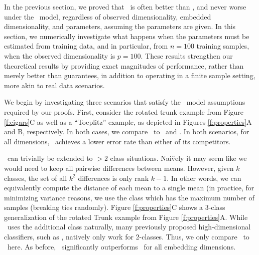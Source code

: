 \documentclass[10pt]{article}
\begin{document}


In the previous section, we proved that \Lol~is often better than \Pca, and never worse under the \Lda~model, regardless of observed dimensionality, embedded dimensionality, and parameters, assuming the parameters are given.  In this section, we numerically investigate what happens when the parameters must be estimated from training data, and in particular, from $n=100$ training samples, when the observed dimensionality is $p=100$.  These results strengthen our theoretical results by providing exact magnitudes of performance, rather than merely better than guarantees, in addition to operating in a finite sample setting, more akin to real data scenarios. 

 We begin by investigating three scenarios that satisfy the \Lda~model assumptions required by our proofs. First, consider  the rotated trunk example from Figure \ref{f:cigars}C as well as a ``Toeplitz'' example, as depicted in Figures \ref{f:properties}A and B, respectively.  In both cases, we compare \Lol~to \FoP~and \Road.  In both scenarios, for all dimensions, \Lol~achieves a lower error rate than either of its competitors. 


 \Lol~can trivially be extended to $>2$ class situations.  Nai\"vely it may seem like we would need to keep all pairwise differences between means.  However, given $k$ classes, the set of all $k^2$ differences is only rank $k-1$.  In other words, we can equivalently compute the distance of each mean to a single mean (in practice, for minimizing variance reasons, we use the class which has the maximum number of samples (breaking ties randomly).  Figure \ref{f:properties}C shows a 3-class generalization of the rotated Trunk example from Figure \ref{f:properties}A.  While \Lol~uses the additional class naturally,  many previously proposed high-dimensional classifiers, such as \Road, natively only work for 2-classes. Thus, we only compare \Lol~to \PoF~here. As before, \Lol~significantly outperforms \PoF~for all embedding dimensions.
\end{document}
